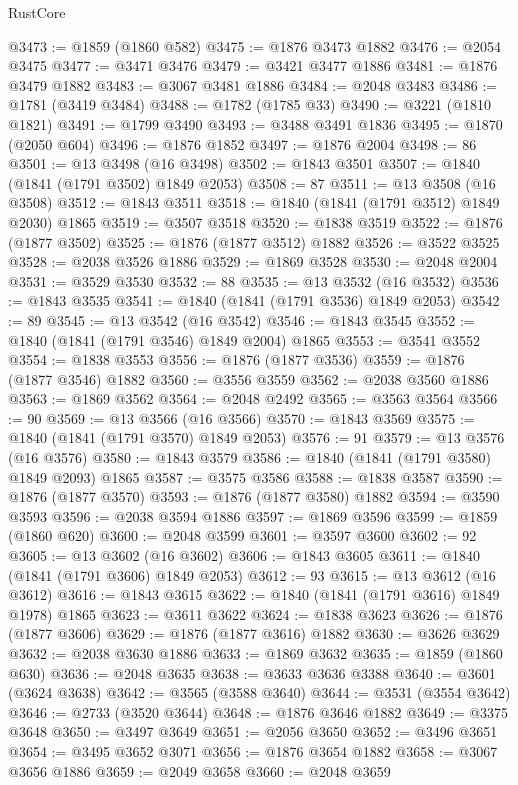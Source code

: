 \begin{lexlean}{RustCore}
\begin{coremodule}
@3473 := @1859 (@1860 @582)
@3475 := @1876 @3473 @1882
@3476 := @2054 @3475
@3477 := @3471 @3476
@3479 := @3421 @3477 @1886
@3481 := @1876 @3479 @1882
@3483 := @3067 @3481 @1886
@3484 := @2048 @3483
@3486 := @1781 (@3419 @3484)
@3488 := @1782 (@1785 @33)
@3490 := @3221 (@1810 @1821)
@3491 := @1799 @3490
@3493 := @3488 @3491 @1836
@3495 := @1870 (@2050 @604)
@3496 := @1876 @1852
@3497 := @1876 @2004
@3498 := 86
@3501 := @13 @3498 (@16 @3498)
@3502 := @1843 @3501
@3507 := @1840 (@1841 (@1791 @3502) @1849 @2053)
@3508 := 87
@3511 := @13 @3508 (@16 @3508)
@3512 := @1843 @3511
@3518 := @1840 (@1841 (@1791 @3512) @1849 @2030) @1865
@3519 := @3507 @3518
@3520 := @1838 @3519
@3522 := @1876 (@1877 @3502)
@3525 := @1876 (@1877 @3512) @1882
@3526 := @3522 @3525
@3528 := @2038 @3526 @1886
@3529 := @1869 @3528
@3530 := @2048 @2004
@3531 := @3529 @3530
@3532 := 88
@3535 := @13 @3532 (@16 @3532)
@3536 := @1843 @3535
@3541 := @1840 (@1841 (@1791 @3536) @1849 @2053)
@3542 := 89
@3545 := @13 @3542 (@16 @3542)
@3546 := @1843 @3545
@3552 := @1840 (@1841 (@1791 @3546) @1849 @2004) @1865
@3553 := @3541 @3552
@3554 := @1838 @3553
@3556 := @1876 (@1877 @3536)
@3559 := @1876 (@1877 @3546) @1882
@3560 := @3556 @3559
@3562 := @2038 @3560 @1886
@3563 := @1869 @3562
@3564 := @2048 @2492
@3565 := @3563 @3564
@3566 := 90
@3569 := @13 @3566 (@16 @3566)
@3570 := @1843 @3569
@3575 := @1840 (@1841 (@1791 @3570) @1849 @2053)
@3576 := 91
@3579 := @13 @3576 (@16 @3576)
@3580 := @1843 @3579
@3586 := @1840 (@1841 (@1791 @3580) @1849 @2093) @1865
@3587 := @3575 @3586
@3588 := @1838 @3587
@3590 := @1876 (@1877 @3570)
@3593 := @1876 (@1877 @3580) @1882
@3594 := @3590 @3593
@3596 := @2038 @3594 @1886
@3597 := @1869 @3596
@3599 := @1859 (@1860 @620)
@3600 := @2048 @3599
@3601 := @3597 @3600
@3602 := 92
@3605 := @13 @3602 (@16 @3602)
@3606 := @1843 @3605
@3611 := @1840 (@1841 (@1791 @3606) @1849 @2053)
@3612 := 93
@3615 := @13 @3612 (@16 @3612)
@3616 := @1843 @3615
@3622 := @1840 (@1841 (@1791 @3616) @1849 @1978) @1865
@3623 := @3611 @3622
@3624 := @1838 @3623
@3626 := @1876 (@1877 @3606)
@3629 := @1876 (@1877 @3616) @1882
@3630 := @3626 @3629
@3632 := @2038 @3630 @1886
@3633 := @1869 @3632
@3635 := @1859 (@1860 @630)
@3636 := @2048 @3635
@3638 := @3633 @3636 @3388
@3640 := @3601 (@3624 @3638)
@3642 := @3565 (@3588 @3640)
@3644 := @3531 (@3554 @3642)
@3646 := @2733 (@3520 @3644)
@3648 := @1876 @3646 @1882
@3649 := @3375 @3648
@3650 := @3497 @3649
@3651 := @2056 @3650
@3652 := @3496 @3651
@3654 := @3495 @3652 @3071
@3656 := @1876 @3654 @1882
@3658 := @3067 @3656 @1886
@3659 := @2049 @3658
@3660 := @2048 @3659

\end{coremodule}
\end{lexlean}
